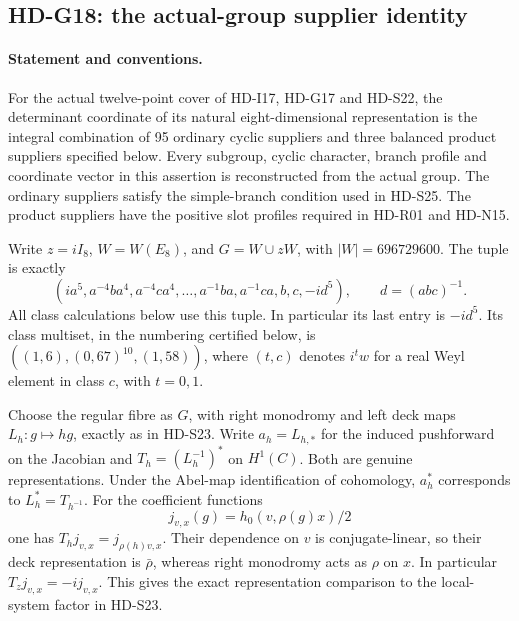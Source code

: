 \subsection{HD-G18: the actual-group supplier identity}
\label{sec:e8-actual-suppliers}

\paragraph{Statement and conventions.}
For the actual twelve-point cover of HD-I17, HD-G17 and HD-S22,
the determinant coordinate of its natural eight-dimensional representation
is the integral combination of 95 ordinary cyclic suppliers and three
balanced product suppliers specified below. Every subgroup, cyclic
character, branch profile and coordinate vector in this assertion is
reconstructed from the actual group. The ordinary suppliers satisfy the
simple-branch condition used in HD-S25. The product suppliers have the
positive slot profiles required in HD-R01 and HD-N15.

Write \(z=iI_8\), \(W=W(E_8)\), and
\(G=W\cup zW\), with \(|W|=696729600\).
The tuple is exactly
\[
 (ia^5,a^{-4}ba^4,a^{-4}ca^4,\ldots,a^{-1}ba,a^{-1}ca,b,c,-id^5),
 \qquad d=(abc)^{-1}.
\]
All class calculations below use this tuple. In particular its last
entry is \(-id^5\). Its class multiset, in the numbering certified below,
is \(( (1,6),(0,67)^{10},(1,58))\), where \((t,c)\) denotes
\(i^tw\) for a real Weyl element in class \(c\), with \(t=0,1\).

Choose the regular fibre as \(G\), with right monodromy and left
deck maps \(L_h:g\mapsto hg\), exactly as in HD-S23.
Write \(a_h=L_{h,*}\) for the induced pushforward on the Jacobian
and \(T_h=(L_h^{-1})^*\) on \(H^1(C)\). Both are genuine
representations. Under the Abel-map identification of cohomology,
\(a_h^*\) corresponds to \(L_h^*=T_{h^{-1}}\).
For the coefficient functions
\[
 j_{v,x}(g)=h_0(v,\rho(g)x)/2
\]
one has \(T_hj_{v,x}=j_{\rho(h)v,x}\). Their dependence on \(v\)
is conjugate-linear, so their deck representation is \(\bar\rho\),
whereas right monodromy acts as \(\rho\) on \(x\).
In particular \(T_zj_{v,x}=-ij_{v,x}\). This gives the exact
representation comparison to the local-system factor in HD-S23.

